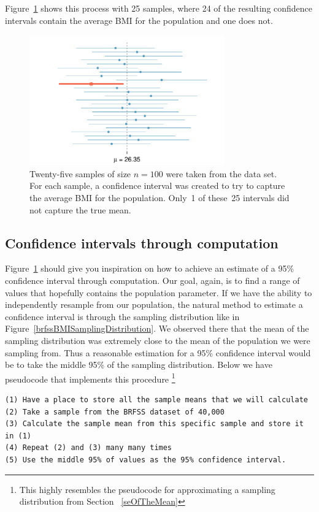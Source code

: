 Figure~\ref{95PercentConfidenceInterval} shows this process with 25 samples, where 24 of the resulting confidence intervals contain the average BMI for the population and one does not.

\begin{figure}[hht]
   \centering
   \includegraphics[width=0.75\textwidth]{ch_inference_foundations_oi_biostat/figures/95PercentConfidenceInterval/95PercentConfidenceInterval}
   \caption{Twenty-five samples of size $n=100$ were taken from the  data set. For each sample, a confidence interval was created to try to capture the average BMI for the population. Only~1 of these~25 intervals did not capture the true mean.}
   \label{95PercentConfidenceInterval}
\end{figure}

\subsection{Confidence intervals through computation}

Figure~\ref{95PercentConfidenceInterval} should give you inspiration on how to achieve an estimate of a 95\% confidence interval through computation. Our goal, again, is to find a range of values that hopefully contains the population parameter. If we have the ability to independently resample from our population, the natural method to estimate a confidence interval is through the sampling distribution like in Figure~\ref{brfssBMISamplingDistribution}. We observed there that the mean of the sampling distribution was extremely close to the mean of the population we were sampling from. Thus a reasonable estimation for a 95\% confidence interval would be to take the middle 95\% of the sampling distribution. Below we have pseudocode that implements this procedure \footnote{This highly resembles the pseudocode for approximating a sampling distribution from Section ~\ref{seOfTheMean}}
\begin{verbatim}
(1) Have a place to store all the sample means that we will calculate
(2) Take a sample from the BRFSS dataset of 40,000
(3) Calculate the sample mean from this specific sample and store it in (1)
(4) Repeat (2) and (3) many many times 
(5) Use the middle 95% of values as the 95% confidence interval. 
\end{verbatim}

